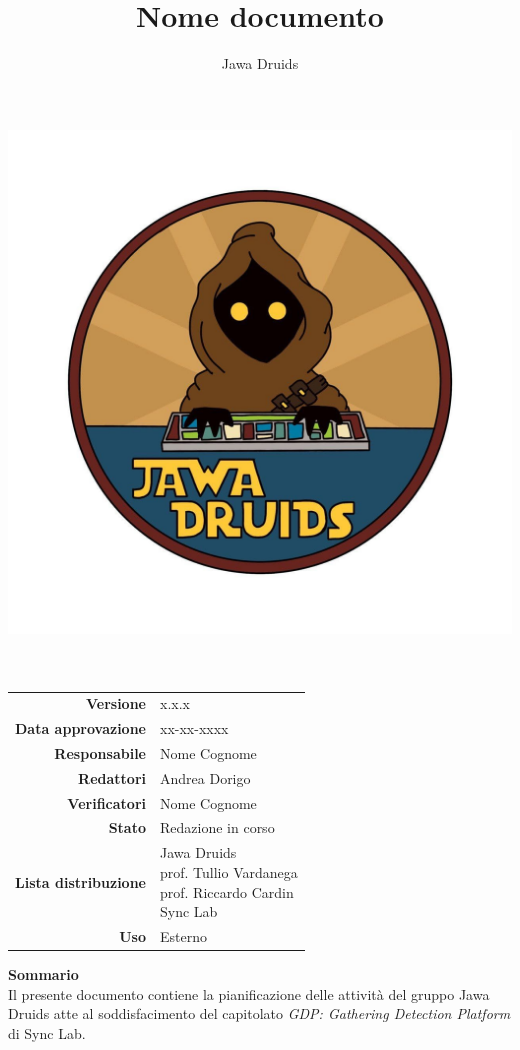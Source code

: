 




\makeatletter
\begin{titlepage}
	\begin{center}
		\vspace*{-5cm}
		\author{Jawa Druids}
		\title{Nome documento}
		\date{} %
		\includegraphics[width=0.7\linewidth]{../immagini/DRUIDSLOGO.jpg}\\[4ex]
		{\huge \bfseries  \@title }\\[2ex]
		{\LARGE  \@author}\\[50ex]
		\vspace*{-9cm}
		\begin{table}[H]
			\renewcommand{\arraystretch}{1.4}
			\centering
			\begin{tabular}{r | l}
				\textbf{Versione} & x.x.x \\%
				\textbf{Data approvazione} & xx-xx-xxxx\\
				\textbf{Responsabile} & Nome Cognome\\
				\textbf{Redattori} & Andrea Dorigo \\
				\textbf{Verificatori} & Nome Cognome \\
				\textbf{Stato} & Redazione in corso\\
				\textbf{Lista distribuzione} & \makecell[tl]{Jawa Druids \\ prof. Tullio Vardanega \\ prof. Riccardo Cardin \\ Sync Lab}\\
				\textbf{Uso} & Esterno
			\end{tabular}
		\end{table}
		\vspace{0.1cm}
		\hfill \break
		\fontsize{17}{10}\textbf{Sommario} \\
		\vspace{0.1cm}
    Il presente documento contiene la pianificazione delle attività del gruppo Jawa Druids atte al soddisfacimento del capitolato \normalsize\textit{GDP: Gathering Detection Platform} di Sync Lab.
	\end{center}
\end{titlepage}
\makeatother

